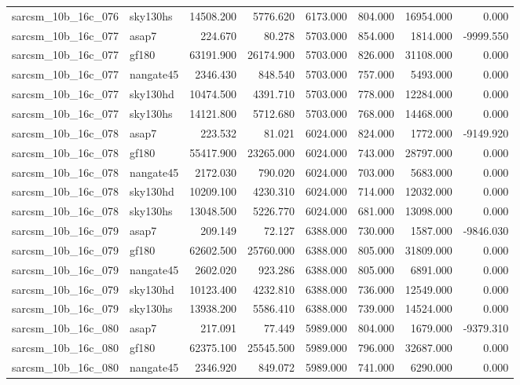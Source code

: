 \begin{tabular}{llrrrrrr}
sarcsm\_10b\_16c\_076 & sky130hs & 14508.200 & 5776.620 & 6173.000 & 804.000 & 16954.000 & 0.000 \\
sarcsm\_10b\_16c\_077 & asap7 & 224.670 & 80.278 & 5703.000 & 854.000 & 1814.000 & -9999.550 \\
sarcsm\_10b\_16c\_077 & gf180 & 63191.900 & 26174.900 & 5703.000 & 826.000 & 31108.000 & 0.000 \\
sarcsm\_10b\_16c\_077 & nangate45 & 2346.430 & 848.540 & 5703.000 & 757.000 & 5493.000 & 0.000 \\
sarcsm\_10b\_16c\_077 & sky130hd & 10474.500 & 4391.710 & 5703.000 & 778.000 & 12284.000 & 0.000 \\
sarcsm\_10b\_16c\_077 & sky130hs & 14121.800 & 5712.680 & 5703.000 & 768.000 & 14468.000 & 0.000 \\
sarcsm\_10b\_16c\_078 & asap7 & 223.532 & 81.021 & 6024.000 & 824.000 & 1772.000 & -9149.920 \\
sarcsm\_10b\_16c\_078 & gf180 & 55417.900 & 23265.000 & 6024.000 & 743.000 & 28797.000 & 0.000 \\
sarcsm\_10b\_16c\_078 & nangate45 & 2172.030 & 790.020 & 6024.000 & 703.000 & 5683.000 & 0.000 \\
sarcsm\_10b\_16c\_078 & sky130hd & 10209.100 & 4230.310 & 6024.000 & 714.000 & 12032.000 & 0.000 \\
sarcsm\_10b\_16c\_078 & sky130hs & 13048.500 & 5226.770 & 6024.000 & 681.000 & 13098.000 & 0.000 \\
sarcsm\_10b\_16c\_079 & asap7 & 209.149 & 72.127 & 6388.000 & 730.000 & 1587.000 & -9846.030 \\
sarcsm\_10b\_16c\_079 & gf180 & 62602.500 & 25760.000 & 6388.000 & 805.000 & 31809.000 & 0.000 \\
sarcsm\_10b\_16c\_079 & nangate45 & 2602.020 & 923.286 & 6388.000 & 805.000 & 6891.000 & 0.000 \\
sarcsm\_10b\_16c\_079 & sky130hd & 10123.400 & 4232.810 & 6388.000 & 736.000 & 12549.000 & 0.000 \\
sarcsm\_10b\_16c\_079 & sky130hs & 13938.200 & 5586.410 & 6388.000 & 739.000 & 14524.000 & 0.000 \\
sarcsm\_10b\_16c\_080 & asap7 & 217.091 & 77.449 & 5989.000 & 804.000 & 1679.000 & -9379.310 \\
sarcsm\_10b\_16c\_080 & gf180 & 62375.100 & 25545.500 & 5989.000 & 796.000 & 32687.000 & 0.000 \\
sarcsm\_10b\_16c\_080 & nangate45 & 2346.920 & 849.072 & 5989.000 & 741.000 & 6290.000 & 0.000 \\

\end{tabular}

